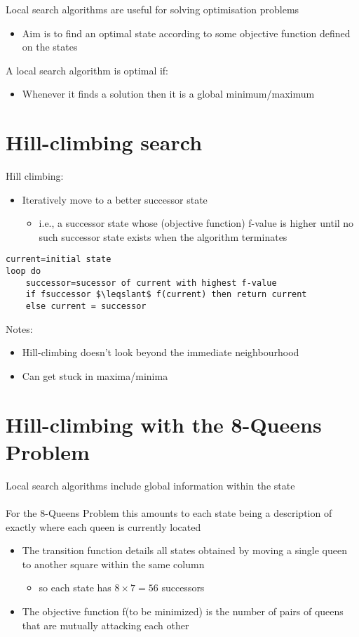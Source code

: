 \documentclass{article}[18pt]
\begin{document}
Local search algorithms are useful for solving optimisation problems
\begin{itemize}
	\item Aim is to find an optimal state according to some objective function defined on the states
\end{itemize}
A local search algorithm is optimal if:
\begin{itemize}
	\item Whenever it finds a solution then it is a global minimum/maximum
\end{itemize}
\section{Hill-climbing search}
Hill climbing:
\begin{itemize}
	\item Iteratively move to a better successor state
	\begin{itemize}
		\item i.e., a successor state whose (objective function) f-value is higher until no such successor state exists when the algorithm terminates
	\end{itemize}
\end{itemize}
\begin{lstlisting}[caption=Hill-climbing]
current=initial state
loop do
	successor=sucessor of current with highest f-value
	if fsuccessor $\leqslant$ f(current) then return current
	else current = successor
\end{lstlisting}
Notes:
\begin{itemize}
	\item Hill-climbing doesn't look beyond the immediate neighbourhood
	\item Can get stuck in maxima/minima
\end{itemize}
\section{Hill-climbing with the 8-Queens Problem}
Local search algorithms include global information within the state\\
\\
For the 8-Queens Problem this amounts to each state being a description of exactly where each queen is currently located
\begin{itemize}
	\item The transition function details all states obtained by moving a single queen to another square within the same column
	\begin{itemize}
		\item so each state has $8\times 7=56$ successors
	\end{itemize}
	\item The objective function f(to be minimized) is the number of pairs of queens that are mutually attacking each other
\end{itemize}
\end{document}
